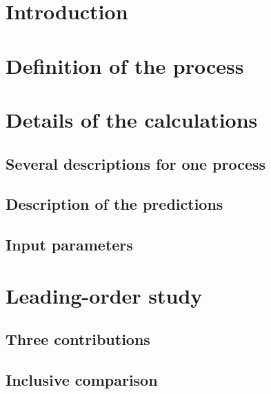 \documentclass[twocolumn,epjc3]{svjour3} %
\begin{document}
\section{Introduction}



\section{Definition of the process}
\label{sec:definition}



\section{Details of the calculations}
\label{sec:details}

\subsection{Several descriptions for one process}



\subsection{Description of the predictions}
\label{subsec:codedescr}



\subsection{Input parameters}
\label{subsec:inputpar}



\section{Leading-order study}
\label{sec:LO}

\subsection{Three contributions}
\label{subsec:contributions}



\subsection{Inclusive comparison}
\label{subsec:LOinclusive}
\end{document}
